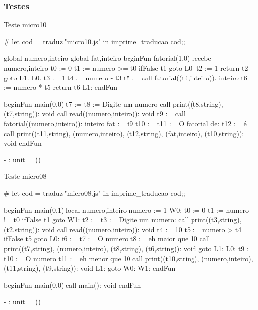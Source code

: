 \documentclass[12pt,a4paper,twoside]{article}
\begin{document}
\subsubsection{Testes}
Teste micro10
\begin{terminal}
# let cod = traduz "micro10.js" in imprime_traducao cod;;

global numero,inteiro
global fat,inteiro
beginFun fatorial(1,0)
recebe numero,inteiro
t0 := 0
t1 := numero >= t0
ifFalse t1 goto L0: 
t2 := 1
return t2
goto L1: 
L0: t3 := 1
t4 := numero - t3
t5 := call fatorial((t4,inteiro)): inteiro
t6 := numero * t5
return t6
L1: endFun

beginFun main(0,0)
t7 := \n
t8 := Digite um numero
call print((t8,string), (t7,string)): void
call read((numero,inteiro)): void
t9 := call fatorial((numero,inteiro)): inteiro
fat := t9
t10 := \n
t11 := O fatorial de: 
t12 :=  é
call print((t11,string), (numero,inteiro), (t12,string), (fat,inteiro), (t10,string)): void
endFun


- : unit = ()
\end{terminal}
Teste micro08
\begin{terminal}
# let cod = traduz "micro08.js" in imprime_traducao cod;;

beginFun main(0,1)
local numero,inteiro
numero := 1
W0: t0 := 0
t1 := numero != t0
ifFalse t1 goto W1: 
t2 := \n
t3 := Digite um numero: 
call print((t3,string), (t2,string)): void
call read((numero,inteiro)): void
t4 := 10
t5 := numero > t4
ifFalse t5 goto L0: 
t6 := \n
t7 := O numero
t8 := eh maior que 10
call print((t7,string), (numero,inteiro), (t8,string), (t6,string)): void
goto L1: 
L0: t9 := \n
t10 := O numero
t11 := eh menor que 10
call print((t10,string), (numero,inteiro), (t11,string), (t9,string)): void
L1: goto W0: 
W1: endFun

beginFun main(0,0)
call main(): void
endFun


- : unit = ()

\end{terminal}


\newpage
{}
\end{document}
